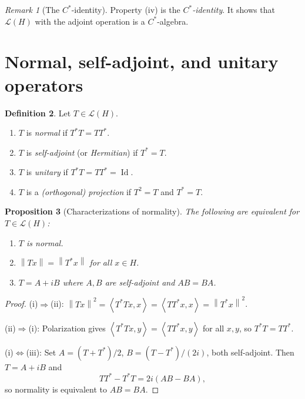 \documentclass[a4paper,12pt]{book}
\DeclareMathOperator{\Id}{Id}
\newcommand{\norm}[1]{\left\| #1 \right\|}
\newcommand{\inner}[2]{\left\langle #1, #2 \right\rangle}
\theoremstyle{definition}
\newtheorem{definition}{Definition}[chapter]
\theoremstyle{plain}
\newtheorem{proposition}[definition]{Proposition}
\theoremstyle{remark}
\newtheorem{remark}[definition]{Remark}
\begin{document}
\begin{remark}[The $C^*$-identity]\label{rem:Cstar}
Property (iv) is the \emph{$C^*$-identity}. It shows that $\mathcal{L}(H)$
with the adjoint operation is a $C^*$-algebra.
\end{remark}

\section{Normal, self-adjoint, and unitary operators}

\begin{definition}\label{def:special-ops}
Let $T\in\mathcal{L}(H)$.
\begin{enumerate}[label=(\roman*)]
  \item $T$ is \emph{normal} if $T^*T = TT^*$.
  \item $T$ is \emph{self-adjoint}
        (or \emph{Hermitian}) if $T^*=T$.
  \item $T$ is \emph{unitary} if
        $T^*T = TT^* = \Id$.
  \item $T$ is a \emph{(orthogonal) projection}
        if $T^2=T$ and $T^*=T$.
\end{enumerate}
\end{definition}

\begin{proposition}[Characterizations of normality]\label{prop:normal-char}
The following are equivalent for $T\in\mathcal{L}(H)$:
\begin{enumerate}[label=(\roman*)]
  \item $T$ is normal.
  \item $\norm{Tx}=\norm{T^*x}$ for all $x\in H$.
  \item $T = A + iB$ where $A,B$ are self-adjoint and $AB=BA$.
\end{enumerate}
\end{proposition}

\begin{proof}
(i)$\Rightarrow$(ii):
$\norm{Tx}^2 = \inner{T^*Tx}{x} = \inner{TT^*x}{x} = \norm{T^*x}^2$.

(ii)$\Rightarrow$(i): Polarization gives
$\inner{T^*Tx}{y}=\inner{TT^*x}{y}$ for all $x,y$, so $T^*T=TT^*$.

(i)$\Leftrightarrow$(iii): Set $A=(T+T^*)/2$, $B=(T-T^*)/(2i)$, both
self-adjoint. Then $T=A+iB$ and
\[
  TT^*-T^*T = 2i(AB-BA),
\]
so normality is equivalent to $AB=BA$.
\end{proof}
\end{document}
